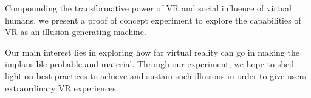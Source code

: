 Compounding the transformative power of VR and social influence of virtual humans, we present a proof of concept experiment to explore the capabilities of VR as an illusion generating machine.

Our main interest lies in exploring how far virtual reality can go in making the implausible probable and material.  Through our experiment, we hope to shed light on best practices to achieve and sustain such illusions in order to give users extraordinary VR experiences. 